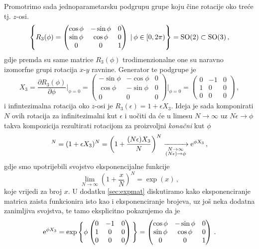 Promotrimo sada jednoparametarsku podgrupu grupe  koju čine
rotacije oko treće tj. $z$-osi.
\begin{displaymath}
\left\{ R_3 (\phi) = 
\begin{pmatrix}
\cos\phi & -\sin\phi & 0 \\
\sin\phi & \cos\phi & 0 \\
0 & 0 & 1 
\end{pmatrix}
 \: | \: \phi \in [0, 2\pi) \right\} = \mathrm{SO}(2) \subset \mathrm{SO}(3) \,,
\end{displaymath}
gdje premda su same matrice $R_3 (\phi)$ trodimenzionalne one su
naravno izomorfne grupi  rotacija $x$-$y$ ravnine.
Generator te podgrupe je
\begin{equation} \label{eq:x3so3}
X_3 = \frac{\partial R_3 (\phi)}{\partial \phi}\Bigg|_{\phi=0}=
\begin{pmatrix}
-\sin\phi & -\cos\phi & 0 \\
\cos\phi & -\sin\phi & 0 \\
0 & 0 & 0 
\end{pmatrix}\Bigg|_{\phi=0} =
\begin{pmatrix}
0 & -1 & 0 \\
1 & 0 & 0 \\
0 & 0 & 0 
\end{pmatrix} \,,
\end{equation}
i infintezimalna rotacija oko $z$-osi je $R_3 (\epsilon) = 1 + \epsilon X_3$.
Ideja je sada komponirati $N$ ovih rotacija za infinitezimalni kut
$\epsilon$ i uočiti da
će u limesu $N \to\infty$ uz $N\epsilon \to \phi$ 
takva kompozicija rezultirati rotacijom za proizvoljni \emph{konačni}
kut $\phi$
\begin{displaymath}
[R_3(\epsilon)]^{N} = (1+\epsilon X_3)^N = \left(1+\frac{(N\epsilon)X_3}
 {N}\right)^N 
 \xrightarrow[\substack{N \to \infty \\ (N\epsilon) \to \phi}]{}
 \rme^{\phi X_3} \,,
\end{displaymath}
gdje smo upotrijebili svojstvo eksponencijalne funkcije
\begin{equation}
    \lim_{N\to\infty}\left(1 + \frac{x}{N}\right)^N = \exp(x) \,,
\end{equation}
koje vrijedi za broj $x$.
U dodatku \ref{sec:expmat} diskutiramo
kako eksponenciranje matrica zaista funkcionira isto kao i
eksponenciranje brojeva, uz još neka dodatna zanimljiva svojstva,
te tamo eksplicitno pokazujemo da je 
\begin{equation}
\textrm{e}^{\phi X_3} = \exp\Bigg\{ 
    \phi  \begin{pmatrix}
0 & -1 & 0 \\
1 & 0 & 0 \\
0 & 0 & 0 
\end{pmatrix}\Bigg\} =
\begin{pmatrix}
\cos\phi & -\sin\phi & 0 \\
\sin\phi & \cos\phi & 0 \\
0 & 0 & 1 \end{pmatrix} \,.
\end{equation}
